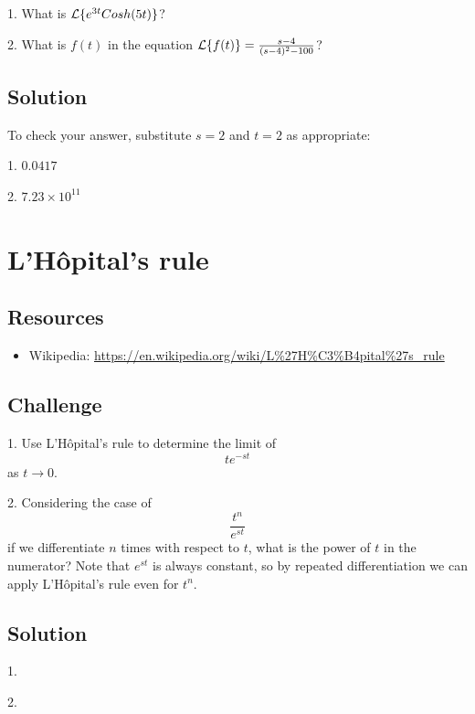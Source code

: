 1. What is $\mathcal{L}\{e^{3t} Cosh(5t)\}$?

2. What is $f(t)$ in the equation $\mathcal{L}\{f(t)\} = \frac{s-4}{(s-4)^2-100}$?

\subsection*{Solution}
To check your answer, substitute $s=2$ and $t=2$ as appropriate:

1. $0.0417$

2. $7.23 \times 10^{11}$




\newpage
\section{L'H\^opital's rule}

\subsection*{Resources}
\begin{itemize}
    \item Wikipedia: \url{https://en.wikipedia.org/wiki/L\%27H\%C3\%B4pital\%27s_rule}
\end{itemize}

\subsection*{Challenge}
1. Use L'H\^opital's rule to determine the limit of
\begin{equation}
    t e^{-st}
\end{equation}
as $t \rightarrow 0$.

2. Considering the case of
\begin{equation}
    \frac{t^n}{e^{st}}
\end{equation}
if we differentiate $n$ times with respect to $t$, what is the power of $t$ in the numerator? Note that $e^{st}$ is always constant, so by repeated differentiation we can apply L'H\^opital's rule even for $t^n$.

\subsection*{Solution}
1. 

2. 




